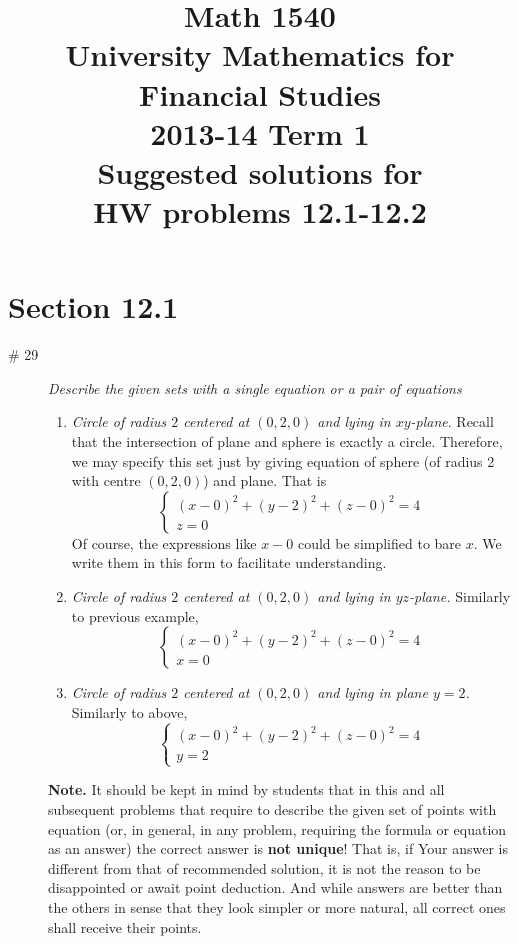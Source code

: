 \documentclass[8pt]{article} %
\title{Math 1540\\University Mathematics for Financial Studies\\2013-14 Term 1\\Suggested solutions for\\HW problems 12.1-12.2}
\begin{document}
\maketitle
	\renewcommand{\v}{\mathbf{v}}
	\renewcommand{\u}{\mathbf{u}}
	\renewcommand{\i}{\mathbf{i}}
	\renewcommand{\j}{\mathbf{j}}
	\renewcommand{\k}{\mathbf{k}}
	\newcommand{\w}{\mathbf{w}}
\section{Section 12.1}
\begin{description}
\item[\# 29]{{\it Describe the given sets with a single equation or a pair of equations}
\begin{enumerate}[label=\bfseries\alph*.]
\item{{\it Circle of radius $2$ centered at $(0,2,0)$ and lying in $xy$-plane}. Recall that the intersection of plane and sphere is exactly a circle.
Therefore, we may specify this set just by giving equation of sphere (of radius 2 with centre $(0,2,0)$) and plane. That is
\[
\begin{cases}
(x-0)^2+(y-2)^2+(z-0)^2=4\\z=0
\end{cases}
\]
Of course, the expressions like $x-0$ could be simplified to bare $x$. We write them in this form to facilitate understanding.
}
\item{{\it Circle of radius $2$ centered at $(0,2,0)$ and lying in $yz$-plane.} Similarly to previous example,
\[
\begin{cases}
(x-0)^2+(y-2)^2+(z-0)^2=4\\x=0
\end{cases}
\]}
\item{{\it Circle of radius $2$ centered at $(0,2,0)$ and lying in plane $y=2$.} Similarly to above,
\[
\begin{cases}
(x-0)^2+(y-2)^2+(z-0)^2=4\\y=2
\end{cases}
\]}
\end{enumerate}
\textbf{Note. } It should be kept in mind by students that in this and all subsequent problems that require to describe the given set
of points with equation (or, in general, in any problem, requiring the formula or equation as an answer) the correct answer is \textbf{not unique}! That is, if Your answer is different from that of recommended solution, it is
not the reason to be disappointed or await point deduction. And while answers are better than the others in sense that they
look simpler or more natural, all correct ones shall receive their points.

}
\end{description}
\end{document}
